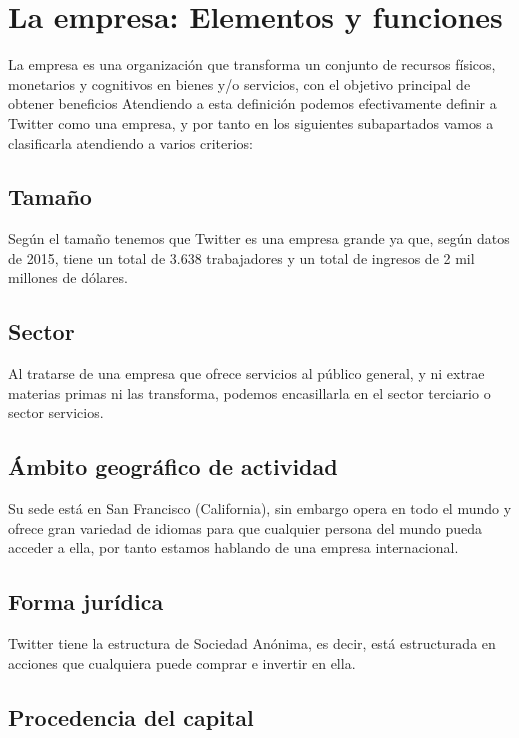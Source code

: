 \section{La empresa: Elementos y funciones}

La empresa es una organización que transforma un conjunto de recursos físicos, monetarios y cognitivos en bienes y/o servicios, con el objetivo principal de obtener beneficios \cite{}
Atendiendo a esta definición podemos efectivamente definir a Twitter como una empresa, y por tanto en los siguientes subapartados vamos a clasificarla atendiendo a varios criterios:

\subsection{Tamaño}

Según el tamaño tenemos que Twitter es una empresa grande ya que, según datos de 2015, tiene un total de 3.638 trabajadores y un total de ingresos de 2 mil millones de dólares.

\subsection{Sector}

Al tratarse de una empresa que ofrece servicios al público general, y ni extrae materias primas ni las transforma, podemos encasillarla en el sector terciario o sector servicios.

\subsection{Ámbito geográfico de actividad}

Su sede está en San Francisco (California), sin embargo opera en todo el mundo y ofrece gran variedad de idiomas para que cualquier persona del mundo pueda acceder a ella, por tanto estamos hablando de una empresa internacional.

\subsection{Forma jurídica}

Twitter tiene la estructura de Sociedad Anónima, es decir, está estructurada en acciones que cualquiera puede comprar e invertir en ella.

\subsection{Procedencia del capital}

